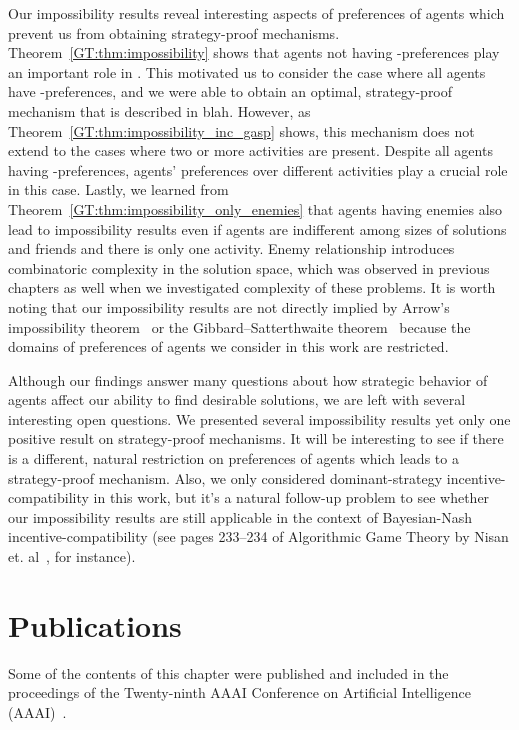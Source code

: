 Our impossibility results reveal interesting aspects of preferences of agents which prevent us from obtaining strategy-proof mechanisms.  Theorem~\ref{GT:thm:impossibility} shows that agents not having \INC-preferences play an important role in \AOIP. This motivated us to consider the case where all agents have \INC-preferences, and we were able to obtain an optimal, strategy-proof mechanism that is described in blah.
However, as Theorem~\ref{GT:thm:impossibility_inc_gasp} shows, this mechanism does not extend to the cases where two or more activities are present. Despite all agents having \INC-preferences, agents' preferences over different activities play a crucial role in this case. Lastly, we learned from Theorem~\ref{GT:thm:impossibility_only_enemies} that agents having enemies also lead to impossibility results even if agents are indifferent among sizes of solutions and friends and there is only one activity. Enemy relationship introduces combinatoric complexity in the solution space, which was observed in previous chapters as well when we investigated complexity of these problems. It is worth noting that our impossibility results are not directly implied by Arrow's impossibility theorem~\cite{arrow2012social} or the Gibbard–Satterthwaite theorem~\cite{gibbard1973manipulation,satterthwaite1975strategy} because the domains of preferences of agents we consider in this work are restricted. 


Although our findings answer many questions about how strategic behavior of agents affect our ability to find desirable solutions, we are left with several interesting open questions. We presented several impossibility results yet only one positive result on strategy-proof mechanisms. It will be interesting to see if there is a different, natural restriction on preferences of agents which leads to a strategy-proof mechanism. Also, we only considered dominant-strategy incentive-compatibility in this work, but it's a natural follow-up problem to see whether our impossibility results are still applicable in the context of Bayesian-Nash incentive-compatibility (see pages 233--234 of Algorithmic Game Theory by Nisan et. al~\cite{nisan2007algorithmic}, for instance).


\section*{Publications}
Some of the contents of this chapter were published and included in the proceedings of the Twenty-ninth AAAI Conference on Artificial Intelligence  (AAAI)~\cite{LEE15AAAI}.